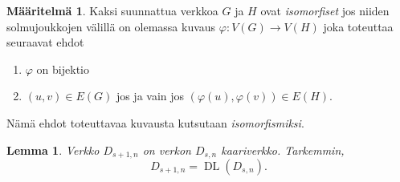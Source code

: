 \documentclass[finnish]{tktltiki2}
\newtheorem{lem}[lau]{Lemma}
\theoremstyle{definition}
\newtheorem{maar}[lau]{Määritelmä}
\theoremstyle{remark}
\newcommand{\from}{\colon}
\DeclareMathOperator{\DL}{DL}
\newcommand{\Dsn}{D_{s,n}}
\newcommand{\Dssn}{D_{s+1,n}}
\begin{document}
\begin{maar}
    Kaksi suunnattua verkkoa $G$ ja $H$ ovat \emph{isomorfiset} jos niiden
    solmujoukkojen välillä on olemassa kuvaus $\varphi \from V(G) \to V(H)$
    joka toteuttaa seuraavat ehdot
    \begin{enumerate}
        \item $\varphi$ on bijektio
        \item $(u,v) \in E(G)$ jos ja vain jos $(\varphi(u), \varphi(v)) \in
            E(H)$.
    \end{enumerate}
    Nämä ehdot toteuttavaa kuvausta kutsutaan \emph{isomorfismiksi}.
\end{maar}

\begin{lem}
    Verkko $\Dssn$ on verkon $\Dsn$ kaariverkko. Tarkemmin,
    \begin{equation*}
        \Dssn = \DL(\Dsn).
    \end{equation*}
\end{lem}
\end{document}
